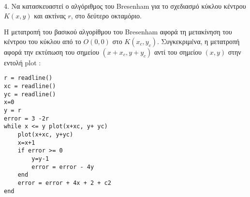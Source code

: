 \begin{exercise}
		
4. Να κατασκευαστεί ο αλγόριθμος του Bresenham για το σχεδιασμό κύκλου κέντρου $Κ(x, y)$ και ακτίνας $r$, στο δεύτερο οκταμόριο.
\end{exercise}

\begin{solution}
	Η μετατροπή του βασικού αλγορίθμου του Bresenham αφορά τη μετακίνηση του κέντρου του κύκλου από το $O(0,0)$ στο $Κ(x_c, y_c)$. Συγκεκριμένα, η μετατροπή αφορά την εκτύπωση του σημείου $(x + x_c,y +y_c)$ αντί του σημείου $(x,y)$ στην εντολή plot :

\begin{lstlisting} 
r = readline() 
xc = readline() 
yc = readline() 
x=0
y = r
error = 3 -2r
while x <= y plot(x+xc, y+ yc)
	plot(x+xc, y+yc)
	x=x+1
	if error >= 0
		y=y-1
		error = error - 4y
	end
	error = error + 4x + 2 + c2
end
\end{lstlisting}		

\end{solution}
